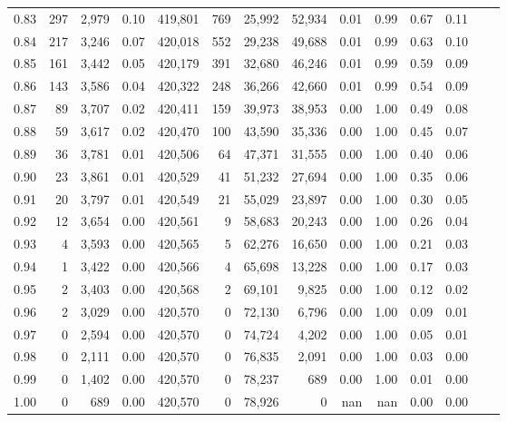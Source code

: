 \begin{tabular}{rrrrrrrrrrrrrr}
0.83 &    297 &  2,979 &     0.10 &  419,801 &      769 &  25,992 &  52,934 &  0.01 &  0.99 &  0.67 &      0.11 \\
0.84 &    217 &  3,246 &     0.07 &  420,018 &      552 &  29,238 &  49,688 &  0.01 &  0.99 &  0.63 &      0.10 \\
0.85 &    161 &  3,442 &     0.05 &  420,179 &      391 &  32,680 &  46,246 &  0.01 &  0.99 &  0.59 &      0.09 \\
0.86 &    143 &  3,586 &     0.04 &  420,322 &      248 &  36,266 &  42,660 &  0.01 &  0.99 &  0.54 &      0.09 \\
0.87 &     89 &  3,707 &     0.02 &  420,411 &      159 &  39,973 &  38,953 &  0.00 &  1.00 &  0.49 &      0.08 \\
0.88 &     59 &  3,617 &     0.02 &  420,470 &      100 &  43,590 &  35,336 &  0.00 &  1.00 &  0.45 &      0.07 \\
0.89 &     36 &  3,781 &     0.01 &  420,506 &       64 &  47,371 &  31,555 &  0.00 &  1.00 &  0.40 &      0.06 \\
0.90 &     23 &  3,861 &     0.01 &  420,529 &       41 &  51,232 &  27,694 &  0.00 &  1.00 &  0.35 &      0.06 \\
0.91 &     20 &  3,797 &     0.01 &  420,549 &       21 &  55,029 &  23,897 &  0.00 &  1.00 &  0.30 &      0.05 \\
0.92 &     12 &  3,654 &     0.00 &  420,561 &        9 &  58,683 &  20,243 &  0.00 &  1.00 &  0.26 &      0.04 \\
0.93 &      4 &  3,593 &     0.00 &  420,565 &        5 &  62,276 &  16,650 &  0.00 &  1.00 &  0.21 &      0.03 \\
0.94 &      1 &  3,422 &     0.00 &  420,566 &        4 &  65,698 &  13,228 &  0.00 &  1.00 &  0.17 &      0.03 \\
0.95 &      2 &  3,403 &     0.00 &  420,568 &        2 &  69,101 &   9,825 &  0.00 &  1.00 &  0.12 &      0.02 \\
0.96 &      2 &  3,029 &     0.00 &  420,570 &        0 &  72,130 &   6,796 &  0.00 &  1.00 &  0.09 &      0.01 \\
0.97 &      0 &  2,594 &     0.00 &  420,570 &        0 &  74,724 &   4,202 &  0.00 &  1.00 &  0.05 &      0.01 \\
0.98 &      0 &  2,111 &     0.00 &  420,570 &        0 &  76,835 &   2,091 &  0.00 &  1.00 &  0.03 &      0.00 \\
0.99 &      0 &  1,402 &     0.00 &  420,570 &        0 &  78,237 &     689 &  0.00 &  1.00 &  0.01 &      0.00 \\
1.00 &      0 &    689 &     0.00 &  420,570 &        0 &  78,926 &       0 &   nan &   nan &  0.00 &      0.00 \\
\bottomrule
\end{tabular}
